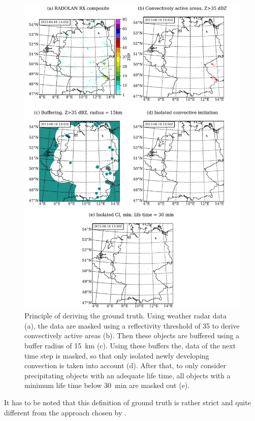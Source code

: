 \begin{figure}[htbp]
\centering
\includegraphics[height=\textheight]{Grafiken/Abbildungen/haberlie_prinzip.pdf}
\caption{Principle of deriving the ground truth. Using weather radar data (a), the data are masked using a reflectivity threshold of \SI{35}{\dbZ} to derive convectively active areas (b). Then these objects are buffered using a buffer radius of \SI{15}{\kilo\metre} (c). Using these buffers the, data of the next time step is masked, so that only isolated newly developing convection is taken into account (d). After that, to only consider precipitating objects with an adequate life  time, all objects with a minimum life time below \SI{30}{min} are masked out (e).}
\label{fig:haberlie}
\end{figure}

It has to be noted that this definition of ground truth is rather strict and quite different from the approach chosen by \citet{Karagiannidis2016}.  

